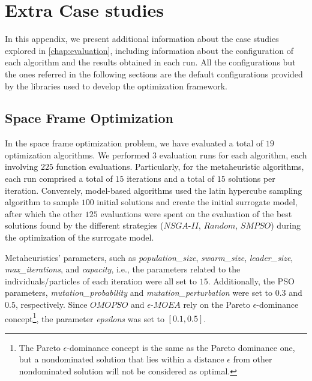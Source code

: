 \chapter{Extra Case studies}
\label{appendix:appendixB}

In this appendix, we present additional information about the case studies explored in \cref{chap:evaluation}, including information about the configuration of each algorithm and the results obtained in each run. All the configurations but the ones referred in the following sections are the default configurations provided by the libraries used to develop the optimization framework.


\section{Space Frame Optimization}
\label{sec:spaceframeoptimizationextra}

In the space frame optimization problem, we have evaluated a total of $19$ optimization algorithms. We performed $3$ evaluation runs for each algorithm, each involving $225$ function evaluations. Particularly, for the metaheuristic algorithms, each run comprised a total of $15$ iterations and a total of $15$ solutions per iteration. Conversely, model-based algorithms used the latin hypercube sampling algorithm to sample $100$ initial solutions and create the initial surrogate model, after which the other $125$ evaluations were spent on the evaluation of the best solutions found by the different strategies ($NSGA$-$II$, $Random$, $SMPSO$) during the optimization of the surrogate model.

Metaheuristics' parameters, such as \textit{population\_size}, \textit{swarm\_size}, \textit{leader\_size}, \textit{max\_iterations}, and \textit{capacity}, i.e., the parameters related to the individuals/particles of each iteration were all set to $15$. Additionally, the \ac{PSO} parameters, \textit{mutation\_probability} and \textit{mutation\_perturbation} were set to $0.3$ and $0.5$, respectively. Since $OMOPSO$ and $\epsilon$-$MOEA$ rely on the Pareto $\epsilon$-dominance concept\footnote{The Pareto $\epsilon$-dominance concept is the same as the Pareto dominance one, but a nondominated solution that lies within a distance $\epsilon$ from other nondominated solution will not be considered as optimal.}, the parameter \textit{epsilons} was set to $[0.1, 0.5]$.

